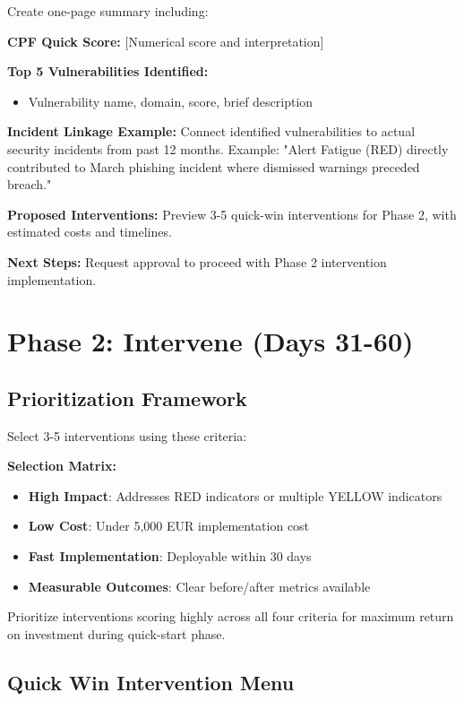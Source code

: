 \documentclass[11pt,a4paper]{article}
\begin{document}
Create one-page summary including:

\textbf{CPF Quick Score:} [Numerical score and interpretation]

\textbf{Top 5 Vulnerabilities Identified:}
\begin{itemize}
\item Vulnerability name, domain, score, brief description
\end{itemize}

\textbf{Incident Linkage Example:}
Connect identified vulnerabilities to actual security incidents from past 12 months. Example: "Alert Fatigue (RED) directly contributed to March phishing incident where dismissed warnings preceded breach."

\textbf{Proposed Interventions:}
Preview 3-5 quick-win interventions for Phase 2, with estimated costs and timelines.

\textbf{Next Steps:}
Request approval to proceed with Phase 2 intervention implementation.

\section{Phase 2: Intervene (Days 31-60)}

\subsection{Prioritization Framework}

Select 3-5 interventions using these criteria:

\textbf{Selection Matrix:}
\begin{itemize}
\item \textbf{High Impact}: Addresses RED indicators or multiple YELLOW indicators
\item \textbf{Low Cost}: Under 5,000 EUR implementation cost
\item \textbf{Fast Implementation}: Deployable within 30 days
\item \textbf{Measurable Outcomes}: Clear before/after metrics available
\end{itemize}

Prioritize interventions scoring highly across all four criteria for maximum return on investment during quick-start phase.

\subsection{Quick Win Intervention Menu}
\end{document}
